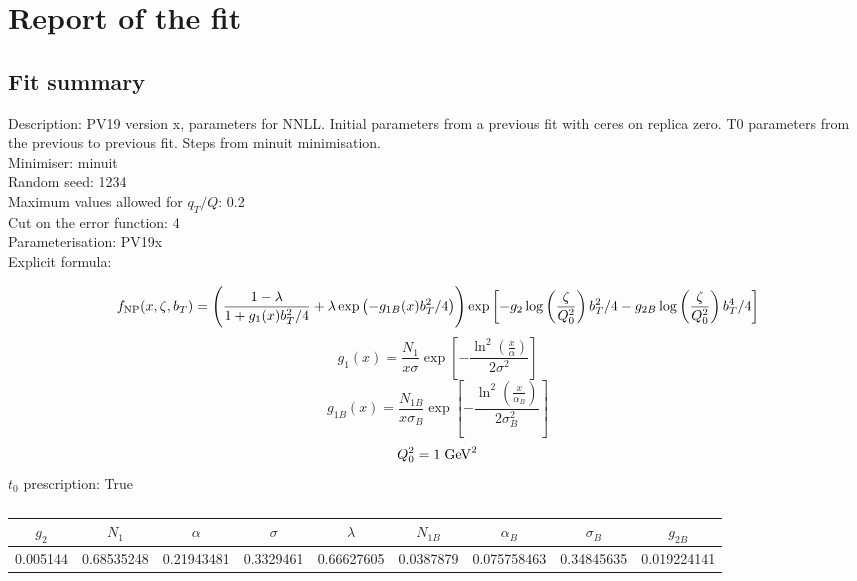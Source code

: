 \documentclass[
]{article}
\date{}
\begin{document}
\hypertarget{report-of-the-fit}{%
\section{Report of the fit}\label{report-of-the-fit}}

\hypertarget{fit-summary}{%
\subsection{Fit summary}\label{fit-summary}}

Description: PV19 version x, parameters for NNLL. Initial parameters
from a previous fit with ceres on replica zero. T0 parameters from the
previous to previous fit. Steps from minuit minimisation.\\
Minimiser: minuit\\
Random seed: 1234\\
Maximum values allowed for \(q_T / Q\): 0.2\\
Cut on the error function: 4\\
Parameterisation: PV19x\\
Explicit formula:

\[f_{\rm NP}(x,\zeta, b_T)= \Biggl(
\frac{1-\lambda}{1 + g_1(x) b_T^2/4} + \lambda \exp \left(-g_{1B}(x) b_T^2 / 4 \right)\Biggr) \exp\left[- g_2 \log\left(\frac{\zeta}{Q_0^2}\right) b_T^2/4 - g_{2B} \log\left(\frac{\zeta}{Q_0^2}\right) b_T^4/4 \right]\]\[g_1(x) = \frac{N_1}{x\sigma} \exp\left[ - \frac{\ln^2\left(\frac{x}{\alpha}\right)}{2 \sigma^2} \right]\]\[g_{1B}(x) = \frac{N_{1B}}{x\sigma_B} \exp\left[ - \frac{\ln^2\left(\frac{x}{\alpha_B}\right)}{2 \sigma_B^2} \right]\]\[Q_0^2 = 1\;{\rm GeV}^2\]
\(t_0\) prescription: True

\begin{table}[h]

\centering

\begin{tabular}{|c|c|c|c|c|c|c|c|c|} \hline

\textbf{\(g_2\)} & \textbf{\(N_1\)} & \textbf{\(\alpha\)} & \textbf{\(\sigma\)} & \textbf{\(\lambda\)} & \textbf{\(N_{1B}\)} & \textbf{\(\alpha_B\)} & \textbf{\(\sigma_B\)} & \textbf{\(g_{2B}\)} \\ \hline

0.005144 & 0.68535248 & 0.21943481 & 0.3329461 & 0.66627605 & 0.0387879 & 0.075758463 & 0.34845635 & 0.019224141 \\ \hline

\end{tabular}

\caption{}

\end{table}
\end{document}
